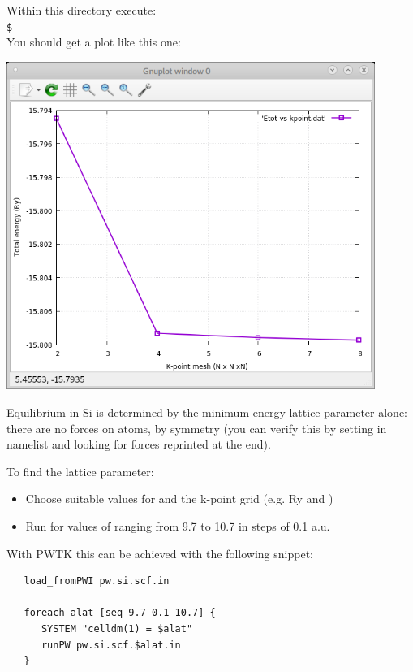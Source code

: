 \documentclass[landscape]{foils}
\def\indent{\hspace*{1cm}}
\def\prompt{\texttt{\$~}}
\begin{document}
Within this directory execute:\\[0.5em]
\indent\prompt{}\\[0.5em]
You should get a plot like this one:\\[-3cm]
\begin{flushright}
  \includegraphics[width=12cm]{figs/etot-vs-kpoints.png}
\end{flushright}

%
Equilibrium in Si is determined by the minimum-energy lattice
parameter alone: there are no forces on atoms, by symmetry (you can
verify this by setting  in namelist
 and looking for forces reprinted at the end).

To find the lattice parameter:
\begin{itemize}
\item Choose suitable values for  and the k-point 
grid {\small (e.g.  Ry and )}
\item Run  for values of  ranging from
  9.7 to 10.7 in steps of 0.1 a.u.
\end{itemize}

With PWTK this can be achieved with the following snippet:
{\codecolor
\begin{verbatim}
   load_fromPWI pw.si.scf.in

   foreach alat [seq 9.7 0.1 10.7] {
      SYSTEM "celldm(1) = $alat"
      runPW pw.si.scf.$alat.in
   }
\end{verbatim}
}
\end{document}
